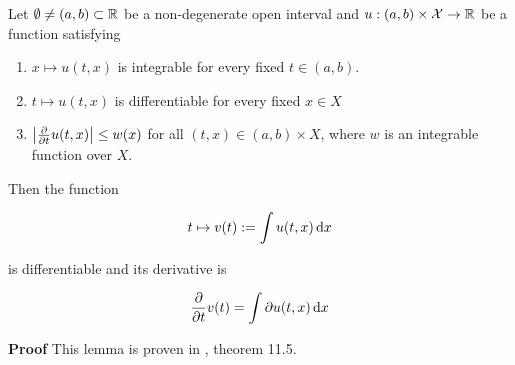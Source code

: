 
\begin{lemma}\label{DiffLemma}
 Let $\emptyset \neq (a,b)\subset\mathbb R$ be a non-degenerate open interval and $u:(a,b)\times \mathcal{X}\to \mathbb R$ be a function satisfying
\begin{enumerate}
  \item $x\mapsto u(t,x)$ is integrable for every fixed $t\in(a,b)$.
  \item $t\mapsto u(t,x)$ is differentiable for every fixed $x\in X$
  \item $\left| {\frac{\partial}{\partial t} u(t,x)} \right|\leq w(x)$ for all $(t,x)\in (a,b)\times X$, where $w$ is an integrable function over $X$.
\end{enumerate}

Then the function 

\begin{equation}
  t\mapsto v(t):=\int u(t,x) \,{\rm d} x
\end{equation}

is differentiable and its derivative is

\begin{equation}
  \frac{\partial}{\partial t} v(t) = \int \partial u(t,x) \,{\rm d} x
\end{equation}
\end{lemma}
\textbf{Proof} This lemma is proven in \cite[p.~92]{schilling.11}, theorem 11.5.\\
